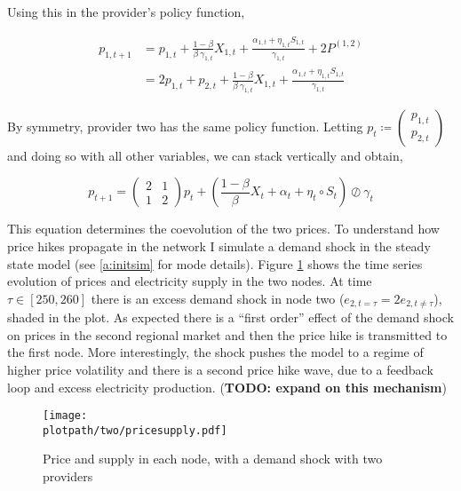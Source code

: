 Using this in the provider's policy function,

\begin{equation*}
  \begin{split}
    p_{1, t+1} &= p_{1, t} + \frac{1-\beta}{\beta \ \gamma_{1, t}} X_{1, t} + \frac{\alpha_{1, t} + \eta_{1, t} S_{1, t}}{\gamma_{1, t}} + 2P^{(1, 2)} \\
    &= 2p_{1, t} + p_{2, t} + \frac{1-\beta}{\beta \ \gamma_{1, t}} X_{1, t} + \frac{\alpha_{1, t} + \eta_{1, t} S_{1, t}}{\gamma_{1, t}}
  \end{split}
\end{equation*}

By symmetry, provider two has the same policy function. Letting $p_t \coloneqq \begin{pmatrix}
    p_{1, t} \\ p_{2, t}
  \end{pmatrix}$ and doing so with all other variables, we can stack vertically and obtain,

\begin{equation}
  p_{t+1} = \begin{pmatrix}
    2 & 1 \\
    1 & 2
  \end{pmatrix} p_t + \left( \frac{1-\beta}{\beta} X_t + \alpha_t + \eta_t \circ S_t \right) \oslash \gamma_t
\end{equation}

This equation determines the coevolution of the two prices. To understand how price hikes propagate in the network I simulate a demand shock in the steady state model (see \ref{a:initsim} for mode details). Figure \ref{fig:two} shows the time series evolution of prices and electricity supply in the two nodes. At time $\tau \in [250, 260]$ there is an excess demand shock in node two ($e_{2, t = \tau} = 2 e_{2, t \neq \tau}$), shaded in the plot. As expected there is a ``first order'' effect of the demand shock on prices in the second regional market and then the price hike is transmitted to the first node. More interestingly, the shock pushes the model to a regime of higher price volatility and there is a second price hike wave, due to a feedback loop and excess electricity production. (\textbf{TODO: expand on this mechanism})


\begin{figure}[H]
  \centering
  \texttt{[image: \\plotpath/two/pricesupply.pdf]}
  \caption{Price and supply in each node, with a demand shock with two providers} \label{fig:two}
\end{figure}

